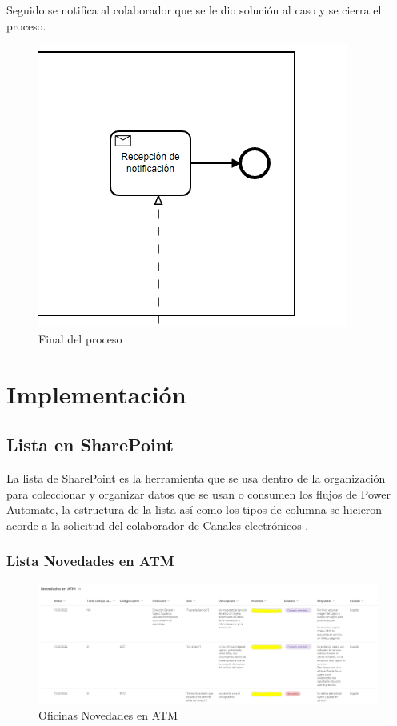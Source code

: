Seguido se notifica al colaborador que se le dio solución al caso y se cierra el proceso.
\begin{figure}[H]
	\centering
	\includegraphics[scale=0.5]{Capitulo3/imagenes/4.png}
	\caption{Final del proceso}
	\label{Finproceso}
\end{figure}

\section{Implementación}
\subsection{Lista en SharePoint}\label{listasSp}
La lista de SharePoint es la herramienta que se usa dentro de la organización para coleccionar y organizar datos que se usan o consumen los flujos de Power Automate, la estructura de la lista así como los tipos de columna se hicieron acorde a la solicitud del colaborador de Canales electrónicos
.
\subsubsection{Lista Novedades en ATM}
\begin{figure}[H]
	\centering
	\includegraphics[scale=0.37]{Capitulo3/imagenes/6.png}
	\caption{Oficinas Novedades en ATM}
	\label{ListaNovedadesEnATM}
\end{figure}

